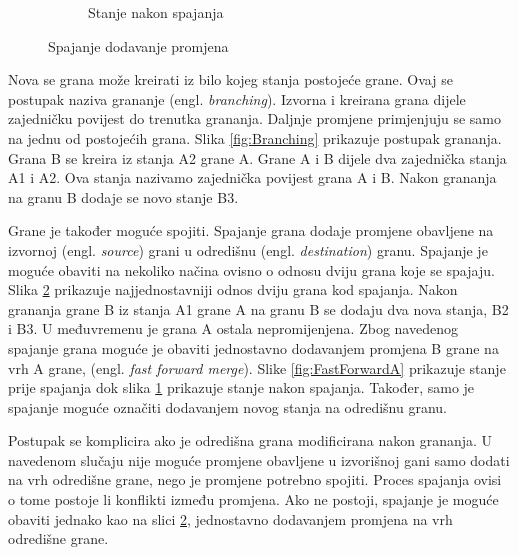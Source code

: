 \documentclass[times, utf8, diplomski, numeric]{fer}
\newcommand{\eng}[1]{(engl. \textit{#1})}
\begin{document}
\begin{figure}
\begin{subfigure}{.49\textwidth}
\caption{Stanje nakon spajanja}
\label{fig:FastForwardB}
\end{subfigure}
\caption{Spajanje dodavanje promjena}
\label{fig:FastForward}
\end{figure}

Nova se grana može kreirati iz bilo kojeg stanja postojeće grane. Ovaj se postupak naziva grananje \eng{branching}. Izvorna i kreirana grana dijele zajedničku povijest do trenutka grananja. Daljnje promjene primjenjuju se samo na jednu od postojećih grana. Slika \ref{fig:Branching} prikazuje postupak grananja. Grana B se kreira iz stanja A2 grane A. Grane A i B dijele dva zajednička stanja A1 i A2. Ova stanja nazivamo zajednička povijest grana A i B. Nakon grananja na granu B dodaje se novo stanje B3.

Grane je također moguće spojiti. Spajanje grana dodaje promjene obavljene na izvornoj \eng{source} grani u odredišnu \eng{destination} granu. Spajanje je moguće obaviti na nekoliko načina ovisno o odnosu dviju grana koje se spajaju. Slika \ref{fig:FastForward} prikazuje najjednostavniji odnos dviju grana kod spajanja. Nakon grananja grane B iz stanja A1 grane A na granu B se dodaju dva nova stanja, B2 i B3. U međuvremenu je grana A ostala nepromijenjena. Zbog navedenog spajanje grana moguće je obaviti jednostavno dodavanjem promjena B grane na vrh A grane, \eng{fast forward merge}. Slike \ref{fig:FastForwardA} prikazuje stanje prije spajanja dok slika \ref{fig:FastForwardB} prikazuje stanje nakon spajanja. Također, samo je spajanje moguće označiti dodavanjem novog stanja na odredišnu granu.

Postupak se komplicira ako je odredišna grana modificirana nakon grananja. U navedenom slučaju nije moguće promjene obavljene u izvorišnoj gani samo dodati na vrh odredišne grane, nego je promjene potrebno spojiti. Proces spajanja ovisi o tome postoje li konflikti između promjena. Ako ne postoji, spajanje je moguće obaviti jednako kao na slici \ref{fig:FastForward}, jednostavno dodavanjem promjena na vrh odredišne grane.
\end{document}
